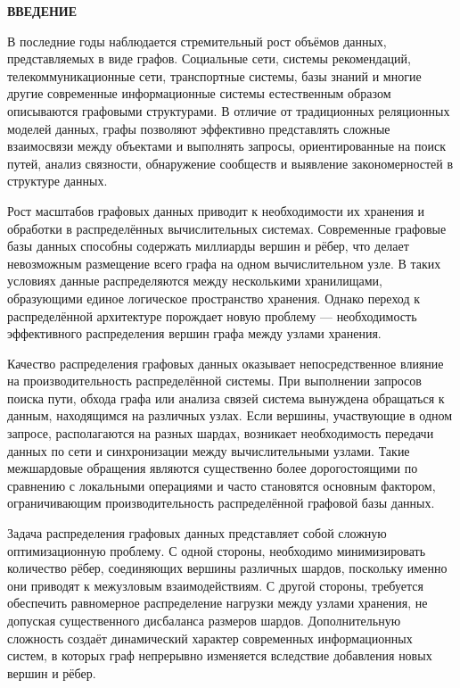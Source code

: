 \begin{center}
    \textbf{ВВЕДЕНИЕ}
        \vspace{-12pt}
\end{center}

В последние годы наблюдается стремительный рост объёмов данных, представляемых в виде графов. Социальные сети, системы рекомендаций, телекоммуникационные сети, транспортные системы, базы знаний и многие другие современные информационные системы естественным образом описываются графовыми структурами. В отличие от традиционных реляционных моделей данных, графы позволяют эффективно представлять сложные взаимосвязи между объектами и выполнять запросы, ориентированные на поиск путей, анализ связности, обнаружение сообществ и выявление закономерностей в структуре данных.

Рост масштабов графовых данных приводит к необходимости их хранения и обработки в распределённых вычислительных системах. Современные графовые базы данных способны содержать миллиарды вершин и рёбер, что делает невозможным размещение всего графа на одном вычислительном узле. В таких условиях данные распределяются между несколькими хранилищами, образующими единое логическое пространство хранения. Однако переход к распределённой архитектуре порождает новую проблему — необходимость эффективного распределения вершин графа между узлами хранения.

Качество распределения графовых данных оказывает непосредственное влияние на производительность распределённой системы. При выполнении запросов поиска пути, обхода графа или анализа связей система вынуждена обращаться к данным, находящимся на различных узлах. Если вершины, участвующие в одном запросе, располагаются на разных шардах, возникает необходимость передачи данных по сети и синхронизации между вычислительными узлами. Такие межшардовые обращения являются существенно более дорогостоящими по сравнению с локальными операциями и часто становятся основным фактором, ограничивающим производительность распределённой графовой базы данных.

Задача распределения графовых данных представляет собой сложную оптимизационную проблему. С одной стороны, необходимо минимизировать количество рёбер, соединяющих вершины различных шардов, поскольку именно они приводят к межузловым взаимодействиям. С другой стороны, требуется обеспечить равномерное распределение нагрузки между узлами хранения, не допуская существенного дисбаланса размеров шардов. Дополнительную сложность создаёт динамический характер современных информационных систем, в которых граф непрерывно изменяется вследствие добавления новых вершин и рёбер.

